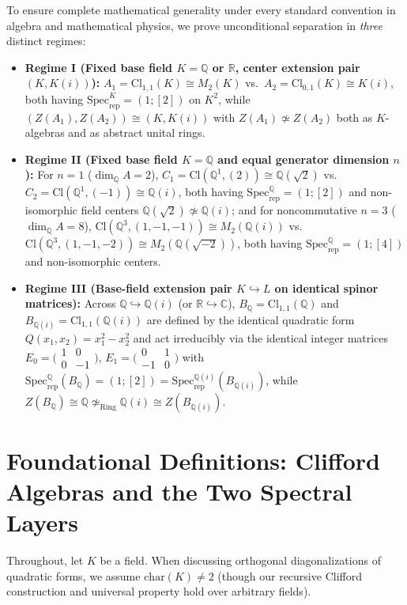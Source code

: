 \documentclass[11pt,a4paper]{article}
\theoremstyle{plain}
\theoremstyle{definition}
\newcommand{\Cl}{\mathrm{Cl}}
\newcommand{\Specrep}{\mathrm{Spec}_{\mathrm{rep}}}
\newcommand{\Mat}{M}
\newcommand{\Q}{\mathbb{Q}}
\newcommand{\R}{\mathbb{R}}
\newcommand{\C}{\mathbb{C}}
\begin{document}
To ensure complete mathematical generality under every standard convention in algebra and mathematical physics, we prove unconditional separation in \emph{three} distinct regimes:
\begin{itemize}
  \item \textbf{Regime I (Fixed base field $K = \Q$ or $\R$, center extension pair $(K, K(i))$):}
  $A_1 = \Cl_{1,1}(K) \cong \Mat_2(K)$ vs.\ $A_2 = \Cl_{0,1}(K) \cong K(i)$, both having $\Specrep^K = (1;[2])$ on $K^2$, while $(Z(A_1), Z(A_2)) \cong (K, K(i))$ with $Z(A_1) \not\simeq Z(A_2)$ both as $K$-algebras and as abstract unital rings.
  \item \textbf{Regime II (Fixed base field $K = \Q$ and equal generator dimension $n$):}
  For $n=1$ ($\dim_\Q A = 2$), $C_1 = \Cl(\Q^1,(2)) \cong \Q(\sqrt{2})$ vs.\ $C_2 = \Cl(\Q^1,(-1)) \cong \Q(i)$, both having $\Specrep^\Q = (1;[2])$ and non-isomorphic field centers $\Q(\sqrt{2}) \not\simeq \Q(i)$; and for noncommutative $n=3$ ($\dim_\Q A = 8$), $\Cl(\Q^3,(1,-1,-1)) \cong \Mat_2(\Q(i))$ vs.\ $\Cl(\Q^3,(1,-1,-2)) \cong \Mat_2(\Q(\sqrt{-2}))$, both having $\Specrep^\Q = (1;[4])$ and non-isomorphic centers.
  \item \textbf{Regime III (Base-field extension pair $K \hookrightarrow L$ on identical spinor matrices):}
  Across $\Q \hookrightarrow \Q(i)$ (or $\R \hookrightarrow \C$), $B_\Q = \Cl_{1,1}(\Q)$ and $B_{\Q(i)} = \Cl_{1,1}(\Q(i))$ are defined by the identical quadratic form $Q(x_1,x_2) = x_1^2 - x_2^2$ and act irreducibly via the identical integer matrices $E_0 = \bigl(\begin{smallmatrix}1&0\\0&-1\end{smallmatrix}\bigr)$, $E_1 = \bigl(\begin{smallmatrix}0&1\\-1&0\end{smallmatrix}\bigr)$ with $\Specrep^\Q(B_\Q) = (1;[2]) = \Specrep^{\Q(i)}(B_{\Q(i)})$, while $Z(B_\Q) \cong \Q \not\simeq_{\mathrm{Ring}} \Q(i) \cong Z(B_{\Q(i)})$.
\end{itemize}

\section{Foundational Definitions: Clifford Algebras and the Two Spectral Layers}

Throughout, let $K$ be a field. When discussing orthogonal diagonalizations of quadratic forms, we assume $\mathrm{char}(K) \neq 2$ (though our recursive Clifford construction and universal property hold over arbitrary fields).
\end{document}
